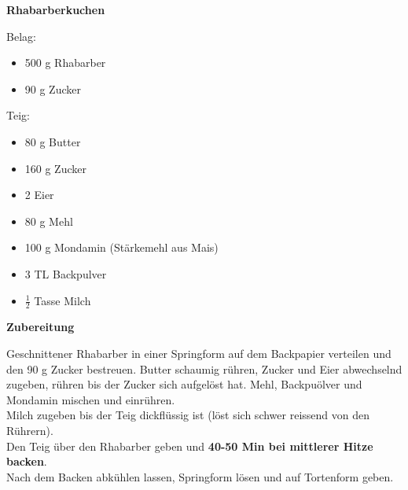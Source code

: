
\parindent0pt	

\pagestyle{empty}


\textbf{{\LARGE Rhabarberkuchen}}%


\hrulefill
\vspace*{\fill}
\begin{multicols}{2}	



Belag:
\begin{itemize}
\item 500 g Rhabarber
\item 90 g Zucker
\end{itemize}
Teig:
\begin{itemize}
\item 80 g Butter
\item 160 g Zucker
\item 2 Eier
\item 80 g Mehl
\item 100 g Mondamin (Stärkemehl aus Mais)
\item 3 TL Backpulver
\item $\frac{1}{2}$ Tasse Milch
\end{itemize}

\end{multicols}
\vfill
\newpage
\textbf{{\LARGE Zubereitung}}%

\hrulefill

\vspace*{\fill}
\begin{multicols}{2}

Geschnittener Rhabarber in einer Springform auf dem Backpapier verteilen und den 90 g Zucker bestreuen.
Butter schaumig rühren, Zucker und Eier abwechselnd zugeben, rühren bis der Zucker sich aufgelöst hat.
Mehl, Backpuölver und Mondamin mischen und einrühren.\\

Milch zugeben bis der Teig dickflüssig ist (löst sich schwer reissend von den Rührern).\\

Den Teig über den Rhabarber geben und \textbf{40-50 Min bei mittlerer Hitze backen}.\\

Nach dem Backen abkühlen lassen, Springform lösen und auf Tortenform geben.



\end{multicols}
\vfill
